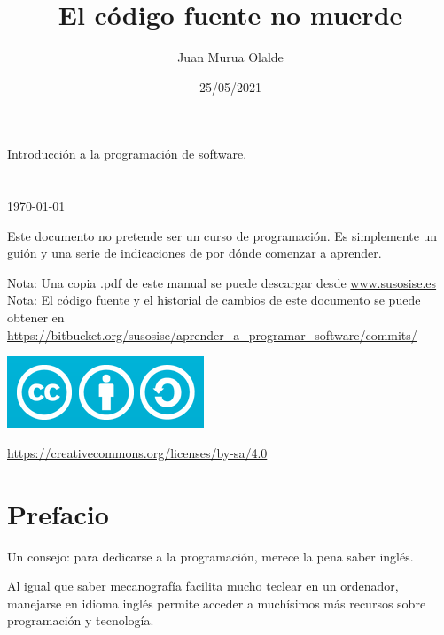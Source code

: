 \documentclass[spanish,12pt,a4paper,final,oneside]{book}
\title{El código fuente no muerde}
\author{Juan Murua Olalde}
\date{25/05/2021}
\begin{document}
\begin{titlepage}

\begin{flushright}
\vspace{2cm}
\begin{Huge}\MyTitle\end{Huge}

Introducción a la programación de software.
\\
\vspace{1cm}
\MyAuthor
\\
\vspace{1cm}
\MyDate
\\ \today
\\
\end{flushright}

\vspace{2cm}
Este documento no pretende ser un curso de programación. Es simplemente un guión y una serie de indicaciones de por dónde comenzar a aprender. 

\vfill
Nota: Una copia .pdf de este manual se puede descargar desde \url{www.susosise.es}
\\Nota: El código fuente y el historial de cambios de este documento se puede obtener en  \\ \url{https://bitbucket.org/susosise/aprender_a_programar_software/commits/}
\begin{flushleft}
\includegraphics[scale=0.3]{CreativeCommons-Attribution-ShareAlike-logo}
\begin{small}\url{https://creativecommons.org/licenses/by-sa/4.0}\end{small}
\end{flushleft}

\end{titlepage}

\hypersetup{linkcolor=black}
\tableofcontents


\chapter*{Prefacio}

Un consejo: para dedicarse a la programación, merece la pena saber inglés.

Al igual que saber mecanografía facilita mucho teclear en un ordenador, manejarse en idioma inglés permite acceder a muchísimos más recursos sobre programación y tecnología.
\end{document}
